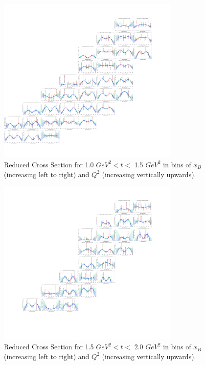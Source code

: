     \begin{figure}[ht]
        \centering
        \includegraphics[trim={14.6cm 4cm 15.2cm 4cm},clip,width=0.8\textwidth]{Chapters/Ch5-Further/c12xsec/combined_t1.0.png}
        \caption[Reduced Cross Section for 1.0 $GeV^2 < t <$ 1.5 $ GeV^2$]{Reduced Cross Section for 1.0 $ GeV^2 < t <$ 1.5 $GeV^2$ in bins of $x_B$ (increasing left to right) and $Q^2$ (increasing vertically upwards). }
        \label{fig:combined_t1.0}
    \end{figure}
    
    \begin{figure}[ht]
        \centering
        \includegraphics[trim={14.6cm 4cm 15.2cm 4cm},clip,width=0.8\textwidth]{Chapters/Ch5-Further/c12xsec/combined_t1.5.png}
        \caption[Reduced Cross Section for 1.5 $GeV^2 < t <$ 2.0 $ GeV^2$]{Reduced Cross Section for 1.5 $ GeV^2 < t <$ 2.0 $GeV^2$ in bins of $x_B$ (increasing left to right) and $Q^2$ (increasing vertically upwards). }
        \label{fig:combined_t1.5}
    \end{figure}

